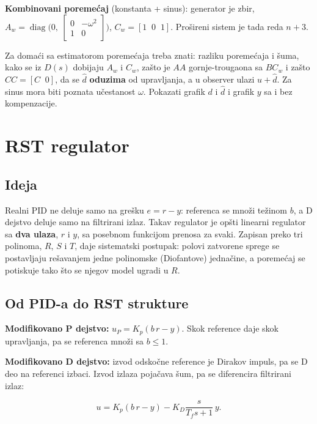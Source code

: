 \documentclass[11pt,a4paper,parskip=half,headsepline,numbers=noenddot]{scrartcl}
\begin{document}
\textbf{Kombinovani poremećaj} (konstanta + sinus): generator je zbir, \(A_w = \operatorname{diag}\big(0,\ \begin{bmatrix}0 & -\omega^2\\ 1 & 0\end{bmatrix}\big)\), \(C_w = [1\;\; 0\;\; 1]\). Prošireni sistem je tada reda \(n + 3\).

\begin{ispit}
Za domaći sa estimatorom poremećaja treba znati: razliku poremećaja i šuma, kako se iz \(D(s)\) dobijaju \(A_w\) i \(C_w\), zašto je \(AA\) gornje-trougaona sa \(BC_w\) i zašto \(CC = [C\;\; 0]\), da se \(\hat d\) \textbf{oduzima} od upravljanja, a u observer ulazi \(u + \hat d\). Za sinus mora biti poznata učestanost \(\omega\). Pokazati grafik \(d\) i \(\hat d\) i grafik \(y\) sa i bez kompenzacije.
\end{ispit}

\section{RST regulator}

\subsection{Ideja}

Realni PID ne deluje samo na grešku \(e = r - y\): referenca se množi težinom \(b\), a D dejstvo deluje samo na filtrirani izlaz. Takav regulator je opšti linearni regulator sa \textbf{dva ulaza}, \(r\) i \(y\), sa posebnom funkcijom prenosa za svaki. Zapisan preko tri polinoma, \(R\), \(S\) i \(T\), daje sistematski postupak: polovi zatvorene sprege se postavljaju rešavanjem jedne polinomske (Diofantove) jednačine, a poremećaj se potiskuje tako što se njegov model ugradi u \(R\).

\subsection{Od PID-a do RST strukture}

\textbf{Modifikovano P dejstvo:} \(u_P = K_p(b\,r - y)\). Skok reference daje skok upravljanja, pa se referenca množi sa \(b \le 1\).

\textbf{Modifikovano D dejstvo:} izvod odskočne reference je Dirakov impuls, pa se D deo na referenci izbaci. Izvod izlaza pojačava šum, pa se diferencira filtrirani izlaz:

\[u = K_p(b\,r - y) - K_D\frac{s}{T_fs+1}\,y .\]
\end{document}
